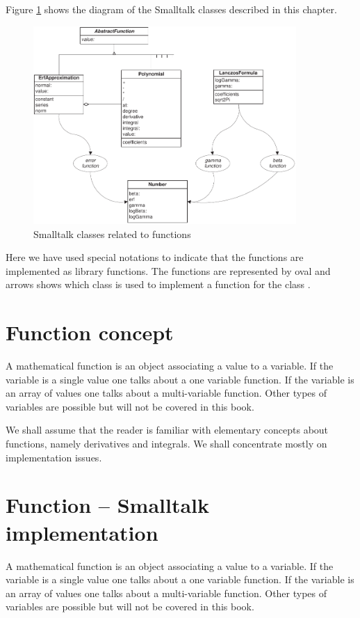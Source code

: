 Figure \ref{fig:functions} shows the diagram of the Smalltalk classes
described in this chapter.
\begin{figure}
\centering\includegraphics[width=10cm]{Figures/FunctionS}
\caption{Smalltalk classes related to functions}
\label{fig:functions}
\end{figure}
Here we have used special notations to indicate that the functions
are implemented as library functions. The functions are
represented by oval and arrows shows which class is used to
implement a function for the class .

\section{Function concept}
\label{sec:function}
A mathematical function is an object
associating a value to a variable. If the variable is a single
value one talks about a one variable function. If the variable is
an array of values one talks about a multi-variable function.
Other types of variables are possible but will not be covered in
this book.

We shall assume that the reader is familiar with elementary
concepts about functions, namely derivatives and integrals. We
shall concentrate mostly on implementation issues.

\section{Function -- Smalltalk implementation}
\label{sec:stFunction}
A mathematical function is an object
associating a value to a variable. If the variable is a single
value one talks about a one variable function. If the variable is
an array of values one talks about a multi-variable function.
Other types of variables are possible but will not be covered in
this book.

